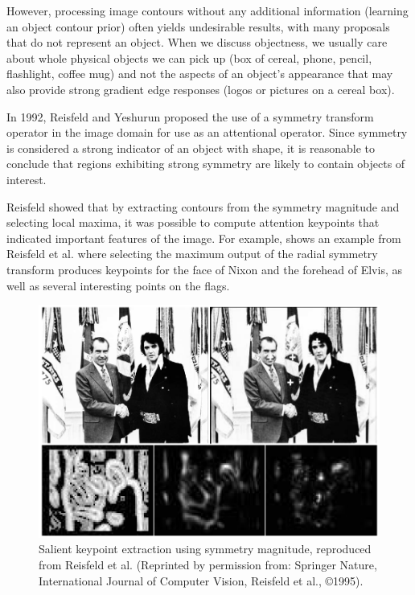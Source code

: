 However, processing image contours without any additional information (\eg learning an object contour prior) often yields undesirable results, with many proposals that do not represent an object. When we discuss objectness, we usually care about whole physical objects we can pick up (box of cereal, phone, pencil, flashlight, coffee mug) and not the aspects of an object's appearance that may also provide strong gradient edge responses (\eg logos or pictures on a cereal box).

In 1992, Reisfeld and Yeshurun proposed the use of a symmetry transform operator\cite{reisfeld_robust_1992} in the image domain for use as an attentional operator. Since symmetry is considered a strong indicator of an object with shape\cite{dickinson_symmetry_2013}, it is reasonable to conclude that regions exhibiting strong symmetry are likely to contain objects of interest.

Reisfeld showed that by extracting contours from the symmetry magnitude and selecting local maxima, it was possible to compute attention keypoints that indicated important features of the image. For example,  shows an example from Reisfeld et al. \cite{reisfeld_context_1995} where selecting the maximum output of the radial symmetry transform produces keypoints for the face of Nixon and the forehead of Elvis, as well as several interesting points on the flags.

\begin{figure}[htbp]
\centering
\includegraphics[width=0.7\linewidth]{Introduction/elvis.png}
\caption[Salient keypoint extraction using symmetry magnitude.]{\label{fig:salient}
Salient keypoint extraction using symmetry magnitude, reproduced from Reisfeld et al.\cite{reisfeld_context_1995} (Reprinted by permission from: Springer Nature, International Journal of Computer Vision, Reisfeld et al., \copyright 1995).}
\end{figure}

